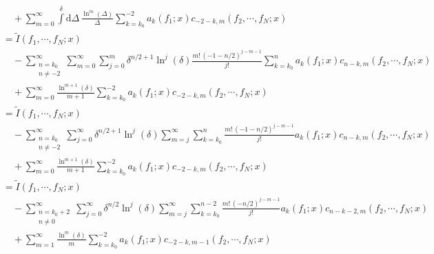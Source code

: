 \documentclass[a4paper,10pt,fleqn]{scrartcl}
\begin{document}
\begin{align*}
        \\ &\quad
        +
        \sum_{m=0}^\infty
        \int\limits^\delta \mathrm{d}\Delta\,
        \frac{\ln^m(\Delta)}{\Delta}
        \sum\limits_{k=k_0}^{-2}
        a_k(f_1;x)
        c_{-2-k,m}(f_2,\cdots,f_N;x)
        \\
        &=
        {\tilde I}(f_1,\cdots,f_N;x)
        \\ &\quad
        -
        \sum_{\substack{n=k_0\\n\neq-2}}^\infty
        \sum_{m=0}^\infty
        \sum\limits_{j=0}^m
        \delta^{n/2+1}
        \ln^j(\delta)
        \frac{m!\,(-1-n/2)^{j-m-1}}{j!}
        \sum\limits_{k=k_0}^n
        a_k(f_1;x)
        c_{n-k,m}(f_2,\cdots,f_N;x)
        \\ &\quad
        +
        \sum_{m=0}^\infty
        \frac{\ln^{m+1}(\delta)}{m+1}
        \sum\limits_{k=k_0}^{-2}
        a_k(f_1;x)
        c_{-2-k,m}(f_2,\cdots,f_N;x)
        \\
        &=
        {\tilde I}(f_1,\cdots,f_N;x)
        \\ &\quad
        -
        \sum_{\substack{n=k_0\\n\neq-2}}^\infty
        \sum_{j=0}^\infty
        \delta^{n/2+1}
        \ln^j(\delta)
        \sum_{m=j}^\infty
        \sum\limits_{k=k_0}^n
        \frac{m!\,(-1-n/2)^{j-m-1}}{j!}
        a_k(f_1;x)
        c_{n-k,m}(f_2,\cdots,f_N;x)
        \\ &\quad
        +
        \sum_{m=0}^\infty
        \frac{\ln^{m+1}(\delta)}{m+1}
        \sum\limits_{k=k_0}^{-2}
        a_k(f_1;x)
        c_{-2-k,m}(f_2,\cdots,f_N;x)
        \\
        &=
        {\tilde I}(f_1,\cdots,f_N;x)
        \\ &\quad
        -
        \sum_{\substack{n=k_0+2\\n\neq0}}^\infty
        \sum_{j=0}^\infty
        \delta^{n/2}
        \ln^j(\delta)
        \sum_{m=j}^\infty
        \sum\limits_{k=k_0}^{n-2}
        \frac{m!\,(-n/2)^{j-m-1}}{j!}
        a_k(f_1;x)
        c_{n-k-2,m}(f_2,\cdots,f_N;x)
        \\ &\quad
        +
        \sum_{m=1}^\infty
        \frac{\ln^m(\delta)}{m}
        \sum\limits_{k=k_0}^{-2}
        a_k(f_1;x)
        c_{-2-k,m-1}(f_2,\cdots,f_N;x)
    \end{align*}
\end{document}
